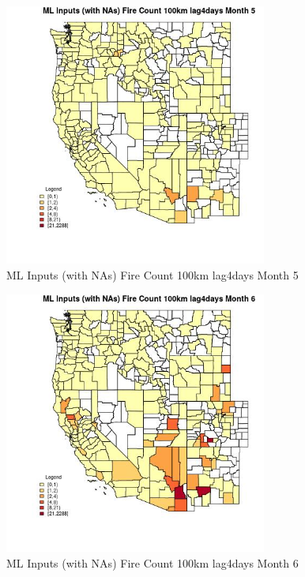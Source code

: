 \clearpage 

\begin{figure} 
\centering  
\includegraphics[width=0.77\textwidth]{Code_Outputs/Report_ML_input_PM25_Step4_part_e_de_duplicated_aves_compiled_2019-05-21wNAs_CountyFire_Count_100km_lag4daysmedianMonth5.jpg} 
\caption{\label{fig:Report_ML_input_PM25_Step4_part_e_de_duplicated_aves_compiled_2019-05-21wNAsCountyFire_Count_100km_lag4daysmedianMonth5}ML Inputs (with NAs) Fire Count 100km lag4days Month 5} 
\end{figure} 
 

\begin{figure} 
\centering  
\includegraphics[width=0.77\textwidth]{Code_Outputs/Report_ML_input_PM25_Step4_part_e_de_duplicated_aves_compiled_2019-05-21wNAs_CountyFire_Count_100km_lag4daysmedianMonth6.jpg} 
\caption{\label{fig:Report_ML_input_PM25_Step4_part_e_de_duplicated_aves_compiled_2019-05-21wNAsCountyFire_Count_100km_lag4daysmedianMonth6}ML Inputs (with NAs) Fire Count 100km lag4days Month 6} 
\end{figure} 
 

